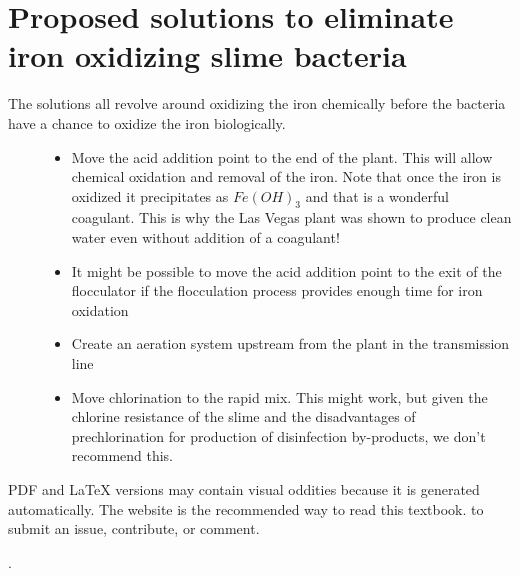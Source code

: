 \documentclass[letterpaper,10pt,english]{sphinxmanual}
\begin{document}
\chapter{Proposed solutions to eliminate iron oxidizing slime bacteria}
\label{\detokenize{Troubleshooting/Troubleshooting:proposed-solutions-to-eliminate-iron-oxidizing-slime-bacteria}}\begin{description}
\item[{The solutions all revolve around oxidizing the iron chemically before the bacteria have a chance to oxidize the iron biologically.}] \leavevmode\begin{itemize}
\item {} 
Move the acid addition point to the end of the plant. This will allow chemical oxidation and removal of the iron. Note that once the iron is oxidized it precipitates as \(Fe(OH)_3\) and that is a wonderful coagulant. This is why the Las Vegas plant was shown to produce clean water even without addition of a coagulant!

\item {} 
It might be possible to move the acid addition point to the exit of the flocculator if the flocculation process provides enough time for iron oxidation

\item {} 
Create an aeration system upstream from the plant in the transmission line

\item {} 
Move chlorination to the rapid mix. This might work, but given the chlorine resistance of the slime and the disadvantages of prechlorination for production of disinfection by-products, we don’t recommend this.

\end{itemize}

\end{description}

\begin{footnote}[1]\sphinxAtStartFootnote
PDF and LaTeX versions may contain visual oddities because it is generated automatically. The website is the recommended way to read this textbook.  to submit an issue, contribute, or comment.
%
\end{footnote}.
\paragraph{}
\end{document}
